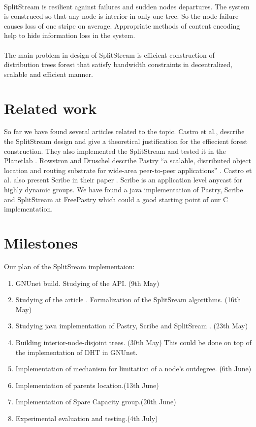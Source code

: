 \documentclass[a4paper,10pt]{article}
\begin{document}
\paragraph{}
SplitStream is resilient against failures and sudden nodes departures. The system is construced so that any node is interior
in only one tree. So the node failure causes loss of one stripe on average. Appropriate methods of content encoding help to
hide information loss in the system.
\paragraph{}
The main problem in design of  SplitStream is efficient construction of distribution trees forest that satisfy bandwidth
constraints in decentralized, scalable and efficient manner.

\section{Related work}
So far we have found several articles related to the topic. Castro et al.\cite{castro1}, \cite{castro2} describe the 
SplitStream design and give a theoretical justification for the effiecient forest construction. They also implemented
the SplitStream and tested it in the Planetlab \cite{Planetlab}. Rowstron and Druschel\cite{Rowstron} describe Pastry
``a scalable, distributed object location and routing substrate for wide-area peer-to-peer applications'' \cite{Rowstron}.
Castro et al. also present Scribe in their paper \cite{castro3}. Scribe is an application level anycast for highly dynamic
groups.
We have found a java implementation of Pastry, Scribe and 
SplitStream at FreePastry \cite{FreePastry} which could a good starting point of our C implementation.

\section{Milestones}
Our plan of the SplitSream implementaion:
\begin{enumerate}
 \item GNUnet\cite{GNUnet} build. Studying of the API. (9th May)
 \item Studying of the article \cite{castro1}. Formalization of the SplitSream algorithms. (16th May)
 \item Studying java implementation of Pastry, Scribe and SplitSream \cite{FreePastry}. (23th May)
 \item Building interior-node-disjoint trees. (30th May)
 \subitem This could be done on top of the implementation of DHT in GNUnet.
 \item Implementation of mechanism for limitation of a node's outdegree. (6th June)
 \item Implementation of parents location.(13th June)
 \item Implementation of Spare Capacity group.(20th June)
 \item Experimental evaluation and testing.(4th July)
\end{enumerate}

{}

\end{document}
